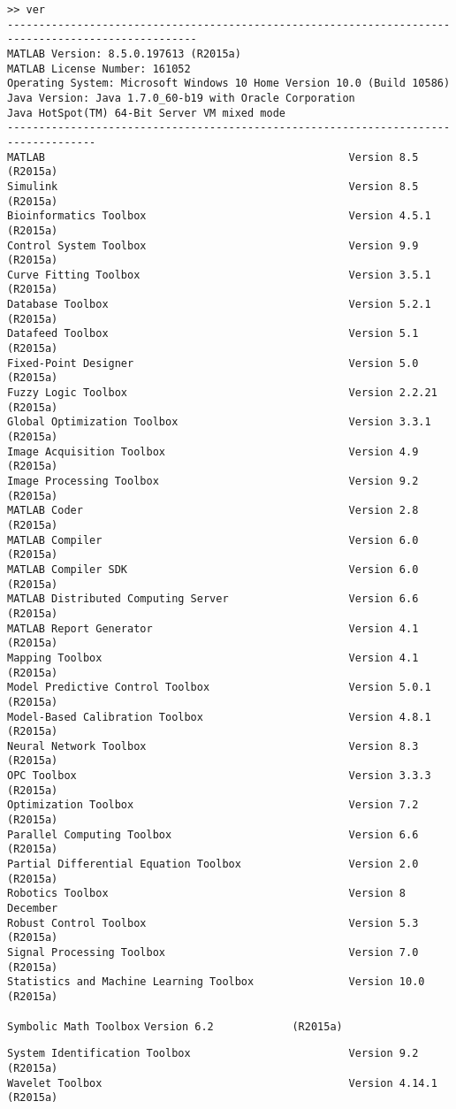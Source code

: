 \begin{verbatim}
>> ver
----------------------------------------------------------------------------------------------------
MATLAB Version: 8.5.0.197613 (R2015a)
MATLAB License Number: 161052
Operating System: Microsoft Windows 10 Home Version 10.0 (Build 10586)
Java Version: Java 1.7.0_60-b19 with Oracle Corporation
Java HotSpot(TM) 64-Bit Server VM mixed mode
------------------------------------------------------------------------------------
MATLAB                                                Version 8.5        (R2015a)
Simulink                                              Version 8.5        (R2015a)
Bioinformatics Toolbox                                Version 4.5.1      (R2015a)
Control System Toolbox                                Version 9.9        (R2015a)
Curve Fitting Toolbox                                 Version 3.5.1      (R2015a)
Database Toolbox                                      Version 5.2.1      (R2015a)
Datafeed Toolbox                                      Version 5.1        (R2015a)
Fixed-Point Designer                                  Version 5.0        (R2015a)
Fuzzy Logic Toolbox                                   Version 2.2.21     (R2015a)
Global Optimization Toolbox                           Version 3.3.1      (R2015a)
Image Acquisition Toolbox                             Version 4.9        (R2015a)
Image Processing Toolbox                              Version 9.2        (R2015a)
MATLAB Coder                                          Version 2.8        (R2015a)
MATLAB Compiler                                       Version 6.0        (R2015a)
MATLAB Compiler SDK                                   Version 6.0        (R2015a)
MATLAB Distributed Computing Server                   Version 6.6        (R2015a)
MATLAB Report Generator                               Version 4.1        (R2015a)
Mapping Toolbox                                       Version 4.1        (R2015a)
Model Predictive Control Toolbox                      Version 5.0.1      (R2015a)
Model-Based Calibration Toolbox                       Version 4.8.1      (R2015a)
Neural Network Toolbox                                Version 8.3        (R2015a)
OPC Toolbox                                           Version 3.3.3      (R2015a)
Optimization Toolbox                                  Version 7.2        (R2015a)
Parallel Computing Toolbox                            Version 6.6        (R2015a)
Partial Differential Equation Toolbox                 Version 2.0        (R2015a)
Robotics Toolbox                                      Version 8          December
Robust Control Toolbox                                Version 5.3        (R2015a)
Signal Processing Toolbox                             Version 7.0        (R2015a)
Statistics and Machine Learning Toolbox               Version 10.0       (R2015a)
\end{verbatim}
{\color{red} \texttt{Symbolic Math Toolbox} \hfill \texttt{Version 6.2} \ \ \ \ \ \ \ \ \ \ \ \ \texttt{(R2015a)}}
\begin{verbatim}
System Identification Toolbox                         Version 9.2        (R2015a)
Wavelet Toolbox                                       Version 4.14.1     (R2015a)
\end{verbatim} 


